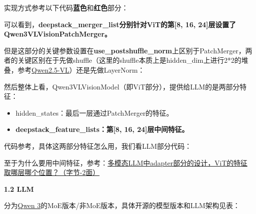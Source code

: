\documentclass[zihao=false,fontset=windows]{ctexart}
\begin{document}
实现方式参考以下代码\textcolor{feishuBlue}{\textbf{蓝色}}和\textcolor{feishuRed}{\textbf{红色}}部分：\par


可以看到，\textcolor{feishuRed}{\textbf{deepstack\_merger\_list分别针对ViT的第[8, 16, 24]层设置了Qwen3VLVisionPatchMerger。}}\par

但是这部分的关键参数设置在\textcolor{feishuRed}{\textbf{use\_postshuffle\_norm}}上区别于PatchMerger，两者的关键区别在于先做shuffle（这里的shuffle本质上是hidden\_dim上进行2*2的堆叠，参考\href{https://scnajei2ds6y.feishu.cn/wiki/S7Q2wviQhiYtQFk4jKvccQwDnWe}{Qwen2.5-VL}）还是先做LayerNorm：\par


然后整体上看，Qwen3VLVisionModel（即ViT部分），提供给LLM的是两部分特征：\par

\begin{itemize}[label=\textcolor{feishuBlue}{\textbullet}]
\item hidden\_states：最后一层通过PatchMerger的特征。

\end{itemize}

\begin{itemize}[label=\textcolor{feishuBlue}{\textbullet}]
\item \textcolor{feishuRed}{\textbf{deepstack\_feature\_lists：第[8, 16, 24]层中间特征。}}

\end{itemize}

代码参考，具体这两部分特征怎么用，我们看LLM部分代码：\par


至于为什么要用中间特征，参考：\href{https://scnajei2ds6y.feishu.cn/wiki/ORZvwHCgti5VehknsbRcLCYTnuh\#share-YCPndVmp9oTL5Dxct5xcxYQTn1e}{多模态LLM中adapter部分的设计，ViT的特征取哪层哪个位置？（字节-2面）}\par


\Needspace{2cm}\par\vspace{0.9em}\begin{tcolorbox}[enhanced,colback=headOrange,boxrule=0pt,arc=4pt,boxsep=0pt,left=3pt,right=3pt,top=2pt,bottom=2pt,before skip=0pt,after skip=3pt]\bfseries \textcolor{feishuBlue}{1.2} LLM\end{tcolorbox}

分为\href{https://swfvqxo30ma.feishu.cn/wiki/Yzb0w1lKJi9EEIkeNHLcpdODnIc?from=from_copylink}{Qwen 3}的MoE版本/非MoE版本，具体开源的模型版本和LLM架构见表：\par
\end{document}
